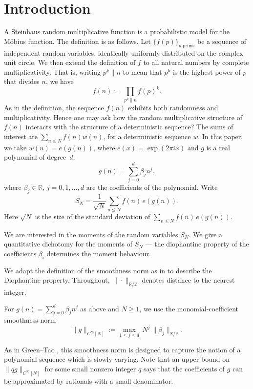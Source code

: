 \section{Introduction}
\label{sec:intro}

  A
Steinhaus random multiplicative function is a probabilistic model 
for the
M\"obius function.
The definition is as follows.
Let $\{f(p)\}_{p\text{ prime}}$ be a sequence of independent random variables,
identically uniformly distributed on the complex unit circle.
We then extend the definition of $f$ to all natural numbers by complete multiplicativity.
That is, writing $p^k\parallel n$ to mean that $p^k$ is the highest power of $p$ that divides $n$, we have
\[
f(n):=\prod_{p^k\parallel n}f(p)^k.
\]
As in the definition, the sequence $f(n)$ exhibits both randomness and multiplicativity.
Hence one may ask how the random multiplicative structure of $f(n)$ interacts with the structure of a deterministic sequence?
The sums of interest are $\sum_{n\le N}f(n)w(n)$, for a deterministic
sequence $w$.
In this paper, we take $w(n)=e(g(n))$, where $e(x)=\exp(2\pi i x)$
and
$g$ is a real polynomial of degree~$d$,
\[
g(n)=\sum_{j=0}^d\beta_j n^j,
\]
where $\beta_j\in\mathbb{R}$, $j=0,1,\ldots,d$ are the coefficients of the polynomial.
Write
\[
S_N=\frac1{\sqrt N}\sum_{n\le N}f(n)\,e(g(n)).
\]
Here $\sqrt N$ is the size of the standard deviation of
$\sum_{n\le N}f(n)\,e(g(n))$.  

We are interested in the moments of the random variables $S_N$.
We give a quantitative dichotomy for the moments of $S_N$ --- the
diophantine property of the coefficients $\beta_i$ determines the moment behaviour.

We adapt the definition 
of the smoothness norm as in \cite{BT} to describe the Diophantine property.
Throughout, $\|\cdot\|_{\mathbb{R}/\mathbb{Z}}$ denotes distance to the nearest integer.


\begin{definition}
\label{def:c-infty}
For $g(n)=\sum_{j=0}^d\beta_j n^j$ as above and $N\geq 1$, we use the
monomial-coefficient smoothness norm
\[
\|g\|_{C^\infty[N]}
:=\max_{1\leq j\leq d}\, N^j\,\|\beta_j\|_{\mathbb{R}/\mathbb{Z}}.
\]
\end{definition}
As in Green--Tao \cite[Definition~2.7]{BT}, this smoothness norm is designed to capture the notion of a polynomial sequence which is slowly-varying.
Note that an upper bound on $\|qg\|_{C^\infty[N]}$ for some small nonzero integer $q$ says that the coefficients of $g$ can be approximated by rationals with a small denominator.



